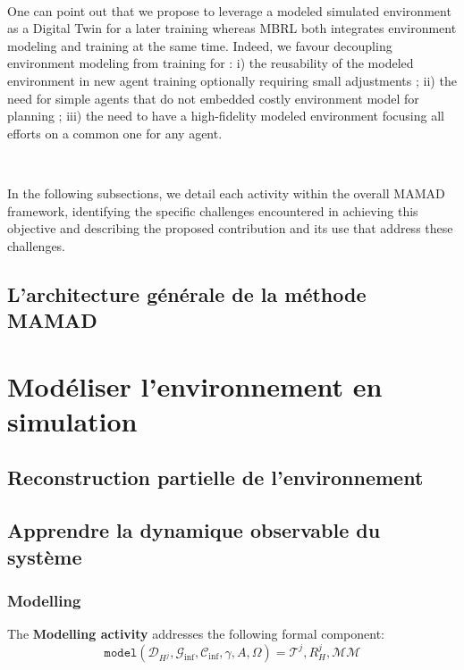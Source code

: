 \

\noindent One can point out that we propose to leverage a modeled simulated environment as a Digital Twin for a later training whereas MBRL both integrates environment modeling and training at the same time. Indeed, we favour decoupling environment modeling from training for : i) the reusability of the modeled environment in new agent training optionally requiring small adjustments ; \quad ii) the need for simple agents that do not embedded costly environment model for planning ; \quad iii) the need to have a high-fidelity modeled environment focusing all efforts on a common one for any agent.

\

\noindent In the following subsections, we detail each activity within the overall MAMAD framework, identifying the specific challenges encountered in achieving this objective and describing the proposed contribution and its use that address these challenges.



\section{L'architecture générale de la méthode MAMAD}

\chapter{Modéliser l'environnement en simulation}
\section{Reconstruction partielle de l'environnement}
\section{Apprendre la dynamique observable du système}


\subsection{Modelling}\label{sec:modelling}

The \textbf{Modelling activity} addresses the following formal component:
\begin{displaymath}
\texttt{model}(\mathcal{D}_{H^j}, \mathcal{G}_{\text{inf}}, \mathcal{C}_{\text{inf}}, \gamma, A, \Omega) = \mathcal{T}^j, R^j_H, \mathcal{MM} 
\end{displaymath}

